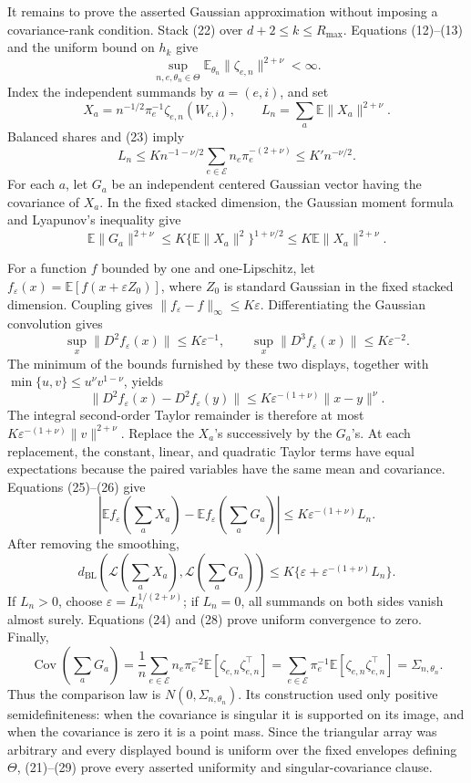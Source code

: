It remains to prove the asserted Gaussian approximation without imposing a covariance-rank condition.  Stack (22) over \(d+2\leq k\leq R_{\max}\).  Equations (12)--(13) and the uniform bound on \(h_k\) give
\[
 \sup_{n,e,\theta_n\in\Theta}
 \mathbb E_{\theta_n}\|\zeta_{e,n}\|^{2+\nu}<\infty. \tag{23}
\]
Index the independent summands by \(a=(e,i)\), and set
\[
 X_a=n^{-1/2}\pi_e^{-1}\zeta_{e,n}(W_{e,i}),
 \qquad L_n=\sum_a\mathbb E\|X_a\|^{2+\nu}.
\]
Balanced shares and (23) imply
\[
 L_n
 \leq K n^{-1-\nu/2}
       \sum_{e\in\mathcal E}n_e\pi_e^{-(2+\nu)}
 \leq K'n^{-\nu/2}. \tag{24}
\]
For each \(a\), let \(G_a\) be an independent centered Gaussian vector having the covariance of \(X_a\).  In the fixed stacked dimension, the Gaussian moment formula and Lyapunov's inequality give
\[
 \mathbb E\|G_a\|^{2+\nu}
 \leq K\{\mathbb E\|X_a\|^2\}^{1+\nu/2}
 \leq K\mathbb E\|X_a\|^{2+\nu}. \tag{25}
\]

For a function \(f\) bounded by one and one-Lipschitz, let
\(f_\varepsilon(x)=\mathbb E[f(x+\varepsilon Z_0)]\), where \(Z_0\) is standard Gaussian in the fixed stacked dimension.  Coupling gives \(\|f_\varepsilon-f\|_\infty\leq K\varepsilon\).  Differentiating the Gaussian convolution gives
\[
 \sup_x\|D^2f_\varepsilon(x)\|\leq K\varepsilon^{-1},
 \qquad
 \sup_x\|D^3f_\varepsilon(x)\|\leq K\varepsilon^{-2}.
\]
The minimum of the bounds furnished by these two displays, together with
\(\min\{u,v\}\leq u^\nu v^{1-\nu}\), yields
\[
 \|D^2f_\varepsilon(x)-D^2f_\varepsilon(y)\|
 \leq K\varepsilon^{-(1+\nu)}\|x-y\|^\nu. \tag{26}
\]
The integral second-order Taylor remainder is therefore at most
\(K\varepsilon^{-(1+\nu)}\|v\|^{2+\nu}\).  Replace the \(X_a\)'s successively by the \(G_a\)'s.  At each replacement, the constant, linear, and quadratic Taylor terms have equal expectations because the paired variables have the same mean and covariance.  Equations (25)--(26) give
\[
 \left|\mathbb Ef_\varepsilon\!\left(\sum_aX_a\right)
       -\mathbb Ef_\varepsilon\!\left(\sum_aG_a\right)\right|
 \leq K\varepsilon^{-(1+\nu)}L_n. \tag{27}
\]
After removing the smoothing,
\[
 d_{\mathrm{BL}}\!\left(\mathcal L\!\left(\sum_aX_a\right),
                         \mathcal L\!\left(\sum_aG_a\right)\right)
 \leq K\{\varepsilon+\varepsilon^{-(1+\nu)}L_n\}. \tag{28}
\]
If \(L_n>0\), choose \(\varepsilon=L_n^{1/(2+\nu)}\); if \(L_n=0\), all summands on both sides vanish almost surely.  Equations (24) and (28) prove uniform convergence to zero.  Finally,
\[
 \operatorname{Cov}\!\left(\sum_aG_a\right)
 =\frac1n\sum_{e\in\mathcal E}n_e\pi_e^{-2}
   \mathbb E[\zeta_{e,n}\zeta_{e,n}^\top]
 =\sum_{e\in\mathcal E}\pi_e^{-1}
   \mathbb E[\zeta_{e,n}\zeta_{e,n}^\top]
 =\Sigma_{n,\theta_n}. \tag{29}
\]
Thus the comparison law is \(N(0,\Sigma_{n,\theta_n})\).  Its construction used only positive semidefiniteness: when the covariance is singular it is supported on its image, and when the covariance is zero it is a point mass.  Since the triangular array was arbitrary and every displayed bound is uniform over the fixed envelopes defining \(\Theta\), (21)--(29) prove every asserted uniformity and singular-covariance clause.

